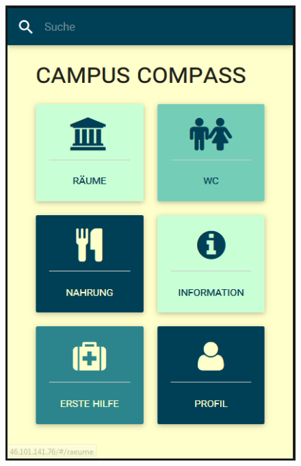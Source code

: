 \begin{figure}[ht]
\begin{minipage}[b]{.5\textwidth}
  \centering
  \includegraphics[width=.8\linewidth]{img/menu.png}
  \label{img:menu-first-draft}
\end{minipage}
\begin{flushleft}
\begin{minipage}[b]{.5\textwidth}
  \centering

\end{minipage}
\end{flushleft}
\end{figure}
